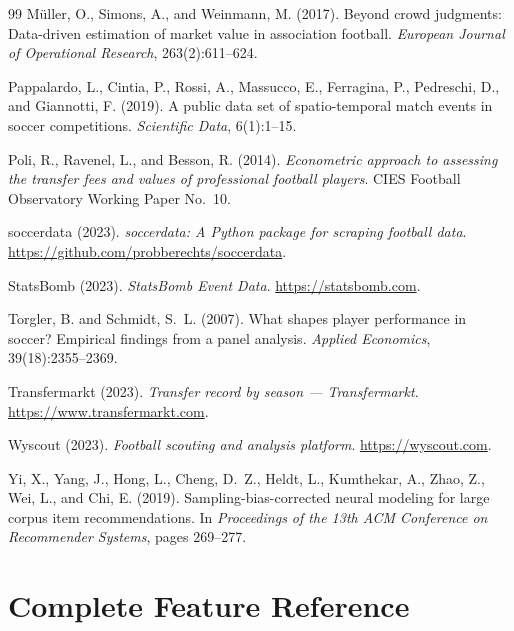 \documentclass[12pt, a4paper, oneside]{report}
\begin{document}
\begin{thebibliography}{99}
Müller, O., Simons, A., and Weinmann, M. (2017).
Beyond crowd judgments: Data-driven estimation of market value in association football.
\textit{European Journal of Operational Research}, 263(2):611--624.

Pappalardo, L., Cintia, P., Rossi, A., Massucco, E., Ferragina, P., Pedreschi, D., and Giannotti, F. (2019).
A public data set of spatio-temporal match events in soccer competitions.
\textit{Scientific Data}, 6(1):1--15.

Poli, R., Ravenel, L., and Besson, R. (2014).
\textit{Econometric approach to assessing the transfer fees and values of professional football players}.
CIES Football Observatory Working Paper No.\ 10.

soccerdata (2023).
\textit{soccerdata: A Python package for scraping football data}.
\url{https://github.com/probberechts/soccerdata}.

StatsBomb (2023).
\textit{StatsBomb Event Data}.
\url{https://statsbomb.com}.

Torgler, B. and Schmidt, S.~L. (2007).
What shapes player performance in soccer? Empirical findings from a panel analysis.
\textit{Applied Economics}, 39(18):2355--2369.

Transfermarkt (2023).
\textit{Transfer record by season --- Transfermarkt}.
\url{https://www.transfermarkt.com}.

Wyscout (2023).
\textit{Football scouting and analysis platform}.
\url{https://wyscout.com}.

Yi, X., Yang, J., Hong, L., Cheng, D.~Z., Heldt, L., Kumthekar, A., Zhao, Z., Wei, L., and Chi, E. (2019).
Sampling-bias-corrected neural modeling for large corpus item recommendations.
In \textit{Proceedings of the 13th ACM Conference on Recommender Systems}, pages 269--277.

\end{thebibliography}

\appendix

\chapter{Complete Feature Reference}
\label{app:features}
\end{document}
